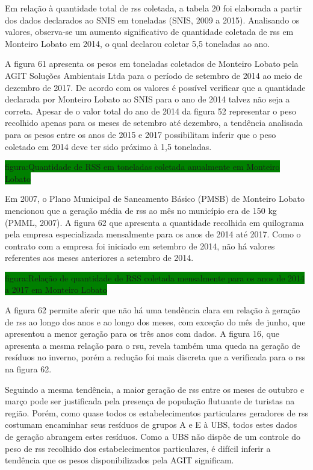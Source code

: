 	Em relação à quantidade total de \gls{rss} coletada, a tabela 20 foi elaborada a partir dos dados declarados ao SNIS em toneladas (SNIS, 2009 a 2015). Analisando os valores, observa-se um aumento significativo de quantidade coletada de \gls{rss} em Monteiro Lobato em 2014, o qual declarou coletar 5,5 toneladas ao ano.
	
	
	
	A figura 61 apresenta os pesos em toneladas coletados de Monteiro Lobato pela AGIT Soluções Ambientais Ltda para o período de setembro de 2014 ao meio de dezembro de 2017. De acordo com os valores é possível verificar que a quantidade declarada por Monteiro Lobato ao SNIS para o ano de 2014 talvez não seja a correta. Apesar de o valor total do ano de 2014 da figura 52 representar o peso recolhido apenas para os meses de setembro até dezembro, a tendência analisada para os pesos entre os anos de 2015 e 2017 possibilitam inferir que o peso coletado em 2014 deve ter sido próximo à 1,5 toneladas.
	
	\colorbox{green}{figura:Quantidade de RSS em toneladas coletada anualmente em Monteiro Lobato}
	
	Em 2007, o Plano Municipal de Saneamento Básico (PMSB) de Monteiro Lobato mencionou que a geração média de \gls{rss} ao mês no município era de 150 kg (PMML, 2007). A figura 62 que apresenta a quantidade recolhida em quilograma pela empresa especializada mensalmente para os anos de 2014 até 2017. Como o contrato com a empresa foi iniciado em setembro de 2014, não há valores referentes aos meses anteriores a setembro de 2014.
	
	\colorbox{green}{figura:Relação de quantidade de RSS coletada mensalmente para os anos de 2014 a 2017 em Monteiro Lobato}
	
	A figura 62 permite aferir que não há uma tendência clara em relação à geração de \gls{rss} ao longo dos anos e ao longo dos meses, com exceção do mês de junho, que apresentou a menor geração para os três anos com dados. A figura 16, que apresenta a mesma relação para o \gls{rsu}, revela também uma queda na geração de resíduos no inverno, porém a redução foi mais discreta que a verificada para o \gls{rss} na figura 62.
	
	Seguindo a mesma tendência, a maior geração de \gls{rss} entre os meses de outubro e março pode ser justificada pela presença de população flutuante de turistas na região. Porém, como quase todos os estabelecimentos particulares geradores de \gls{rss} costumam encaminhar seus resíduos de grupos A e E à UBS, todos estes dados de geração abrangem estes resíduos. Como a UBS não dispõe de um controle do peso de \gls{rss} recolhido dos estabelecimentos particulares, é difícil inferir a tendência que os pesos disponibilizados pela AGIT significam.
	
